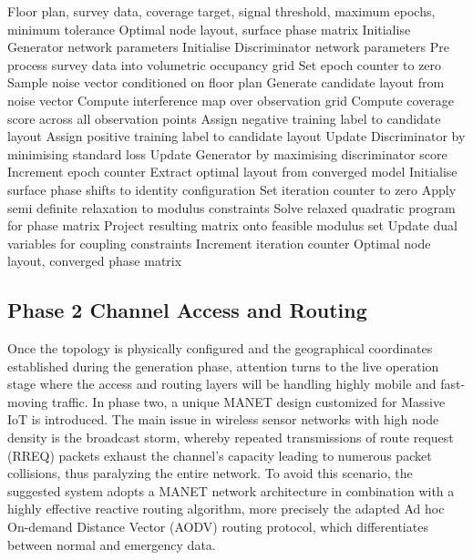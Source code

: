 \documentclass[a4paper,fleqn]{cas-dc}
\numberwithin{equation}{section}
\begin{document}
\begin{algorithm}[!ht]
\caption{Generative Network and Intelligent Surface Optimization}
\label{alg:topology}
\begin{algorithmic}[1]
\renewcommand{\algorithmicrequire}{\textbf{Input:}}
\renewcommand{\algorithmicensure}{\textbf{Output:}}
\REQUIRE Floor plan, survey data, coverage target, signal threshold, maximum epochs, minimum tolerance
\ENSURE Optimal node layout, surface phase matrix
\STATE Initialise Generator network parameters
\STATE Initialise Discriminator network parameters
\STATE Pre process survey data into volumetric occupancy grid
\STATE Set epoch counter to zero
\STATE Sample noise vector conditioned on floor plan
\STATE Generate candidate layout from noise vector
\STATE Compute interference map over observation grid
\STATE Compute coverage score across all observation points
\STATE Assign negative training label to candidate layout
\ELSE
\STATE Assign positive training label to candidate layout
\ENDIF
\STATE Update Discriminator by minimising standard loss
\STATE Update Generator by maximising discriminator score
\STATE Increment epoch counter
\ENDWHILE
\STATE Extract optimal layout from converged model
\STATE Initialise surface phase shifts to identity configuration
\STATE Set iteration counter to zero
\STATE Apply semi definite relaxation to modulus constraints
\STATE Solve relaxed quadratic program for phase matrix
\STATE Project resulting matrix onto feasible modulus set
\STATE Update dual variables for coupling constraints
\STATE Increment iteration counter
\ENDWHILE
\RETURN Optimal node layout, converged phase matrix
\end{algorithmic}
\end{algorithm}

\subsection{Phase 2 Channel Access and Routing}

Once the topology is physically configured and the geographical coordinates established during the generation phase, attention turns to the live operation stage where the access and routing layers will be handling highly mobile and fast-moving traffic. In phase two, a unique MANET design customized for Massive IoT is introduced. The main issue in wireless sensor networks with high node density is the broadcast storm, whereby repeated transmissions of route request (RREQ) packets exhaust the channel’s capacity leading to numerous packet collisions, thus paralyzing the entire network. To avoid this scenario, the suggested system adopts a MANET network architecture in combination with a highly effective reactive routing algorithm, more precisely the adapted Ad hoc On-demand Distance Vector (AODV) routing protocol, which differentiates between normal and emergency data.
\end{document}
